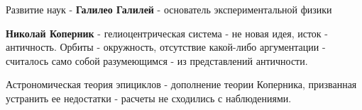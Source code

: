 \documentclass{article}
\begin{document}
\begin{flushleft}
Развитие наук - \textbf{Галилео Галилей} - основатель экспериментальной физики

\textbf{Николай Коперник} - гелиоцентрическая система - не новая идея, исток - античность. Орбиты - окружность, отсутствие какой-либо аргументации - считалось само собой разумеющимся - из представлений античности.

Астрономическая теория эпициклов - дополнение теории Коперника, призванная устранить ее недостатки - расчеты не сходились с наблюдениями.

\end{flushleft}
\end{document}
